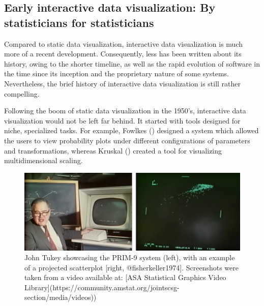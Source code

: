 \documentclass[
]{book}
\begin{document}
\subsection{Early interactive data visualization: By statisticians for statisticians}\label{early-interactive}

Compared to static data visualization, interactive data visualization is much more of a recent development. Consequently, less has been written about its history, owing to the shorter timeline, as well as the rapid evolution of software in the time since its inception and the proprietary nature of some systems. Nevertheless, the brief history of interactive data visualization is still rather compelling.

Following the boom of static data visualization in the 1950's, interactive data visualization would not be left far behind. It started with tools designed for niche, specialized tasks. For example, Fowlkes () designed a system which allowed the users to view probability plots under different configurations of parameters and transformations, whereas Kruskal () created a tool for visualizing multidimensional scaling.

\begin{figure}

{\centering \includegraphics[width=47.12in]{./figures/prim9} 

}

\caption{John Tukey showcasing the PRIM-9 system (left), with an example of a projected scatterplot [right, @fisherkeller1974]. Screenshots were taken from a video available at: [ASA Statistical Graphics Video Library](https://community.amstat.org/jointscsg-section/media/videos))}\label{fig:unnamed-chunk-4}
\end{figure}
\end{document}
